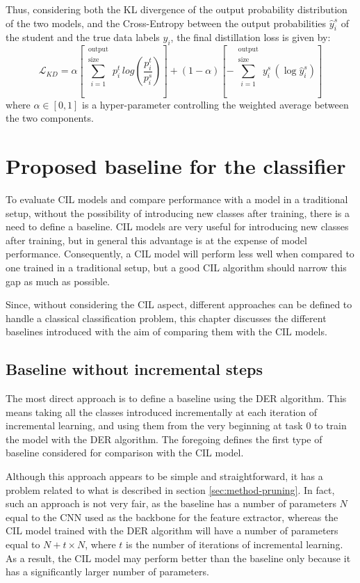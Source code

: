 Thus, considering both the KL divergence of the output probability distribution of the two models, and the Cross-Entropy between the output probabilities $\hat{y}_i^s$ of the student and the true data labels $y_i$, the final distillation loss is given by:
\begin{equation}
    \mathcal{L}_{KD} = \alpha \left[\sum_{i=1}^{\substack{\text{output}\\\text{size}}} p_i^t \, log \left( \frac{p_i^t}{p_i^s} \right) \right]
    + (1-\alpha) \left[-\sum_{i=1}^{\substack{\text{output}\\\text{size}}} y_i^s \, (\log \hat{y}_i^s) \right]
\end{equation}
where $\alpha \in [0, 1]$ is a hyper-parameter controlling the weighted average between the two components.

\section{Proposed baseline for the classifier}
\label{sec:method-baseline}
To evaluate CIL models and compare performance with a model in a traditional setup, without the possibility of introducing new classes after training, there is a need to define a baseline. CIL models are very useful for introducing new classes after training, but in general this advantage is at the expense of model performance. Consequently, a CIL model will perform less well when compared to one trained in a traditional setup, but a good CIL algorithm should narrow this gap as much as possible. 

Since, without considering the CIL aspect, different approaches can be defined to handle a classical classification problem, this chapter discusses the different baselines introduced with the aim of comparing them with the CIL models.

\subsection{Baseline without incremental steps}
The most direct approach is to define a baseline using the DER algorithm. This means taking all the classes introduced incrementally at each iteration of incremental learning, and using them from the very beginning at task 0 to train the model with the DER algorithm. The foregoing defines the first type of baseline considered for comparison with the CIL model.

Although this approach appears to be simple and straightforward, it has a problem related to what is described in section \autoref{sec:method-pruning}. In fact, such an approach is not very fair, as the baseline has a number of parameters $N$ equal to the CNN used as the backbone for the feature extractor, whereas the CIL model trained with the DER algorithm will have a number of parameters equal to $N + t \times N$, where $t$ is the number of iterations of incremental learning. As a result, the CIL model may perform better than the baseline only because it has a significantly larger number of parameters.


